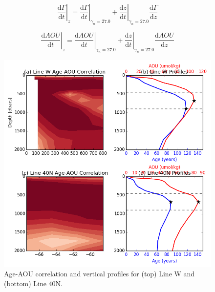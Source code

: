 \begin{equation}
	\left. \frac{\mathrm{d}\Gamma}{\mathrm{d}t}\right|_z = \left. \frac{\mathrm{d}\Gamma}{\mathrm{d}t}\right|_{\gamma_n=27.0} + \left. \frac{\mathrm{d}z}{\mathrm{d}t}\right|_{\gamma_n=27.0} \frac{\mathrm{d}\Gamma}{\mathrm{d}z}
\end{equation}

\begin{equation}
 \left. \frac{\mathrm{d}AOU}{\mathrm{d}t}\right|_z = \left. \frac{\mathrm{d}AOU}{\mathrm{d}t}\right|_{\gamma_n=27.0} + \left. \frac{\mathrm{d}z}{\mathrm{d}t}\right|_{\gamma_n=27.0} \frac{\mathrm{d}AOU}{\mathrm{d}z}
\end{equation}

\begin{figure}
\centering
\includegraphics[width=\linewidth]{age_aou_corr_linew_line40N.png}
\caption{Age-AOU correlation and vertical profiles for (top) Line W and (bottom) Line 40N.}
\label{fig:fig6}
\end{figure}

